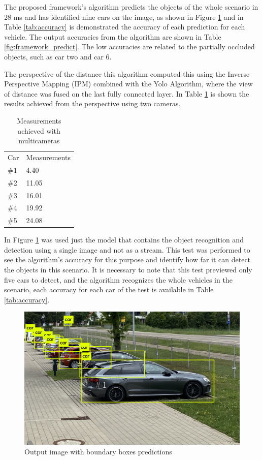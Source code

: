 The proposed framework's algorithm predicts the objects of the whole scenario in 28 ms and has identified nine cars on the image, as shown in Figure \ref{fig:park_predict} and in Table \ref{tab:accuracy} is demonstrated the accuracy of each prediction for each vehicle. The output accuracies from the algorithm are shown in Table \ref{fig:framework_predict}. The low accuracies are related to the partially occluded objects, such as car two and car 6. 

The perspective of the distance this algorithm computed this using the Inverse Perspective Mapping (IPM) combined with the Yolo Algorithm, where the view of distance was fused on the last fully connected layer. In Table \ref{tab:output_framework} is shown the results achieved from the perspective using two cameras. 

\begin{table}[H]
\centering
\caption{Measurements achieved with multicameras}
\begin{tabular}{l|l} 
\toprule
Car &  Measurements      \\
\#1   & 4.40        \\
\#2   & 11.05       \\
\#3   & 16.01       \\
\#4   & 19.92       \\
\#5   & 24.08       \\
\bottomrule
\end{tabular}
\label{tab:output_framework}
\end{table} 
 

In Figure \ref{fig:park_predict} was used just the model that contains the object recognition and detection using a single image and not as a stream. This test was performed to see the algorithm's accuracy for this purpose and identify how far it can detect the objects in this scenario. It is necessary to note that this test previewed only five cars to detect, and the algorithm recognizes the whole vehicles in the scenario, each accuracy for each car of the test is available in Table \ref{tab:accuracy}.


\begin{figure}[H]
\centering
\includegraphics[scale=0.3]{imagens/predictions.jpg}
\caption{Output image with boundary boxes predictions}
\label{fig:park_predict}
\end{figure}



